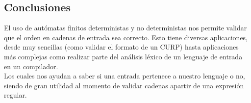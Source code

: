 \subsection{Conclusiones}
	El uso de autómatas finitos deterministas y no deterministas nos permite validar que el orden en cadenas de entrada sea correcto.
	Esto tiene diversas aplicaciones, desde muy sencillas (como validar el formato de un CURP) hasta aplicaciones más complejas como realizar parte del análisis léxico de un lenguaje de entrada en un compilador.\\Los cuales nos ayudan a saber si una entrada pertenece a nuestro lenguaje o no, siendo de gran utilidad al momento de validar cadenas apartir de una expresión regular.